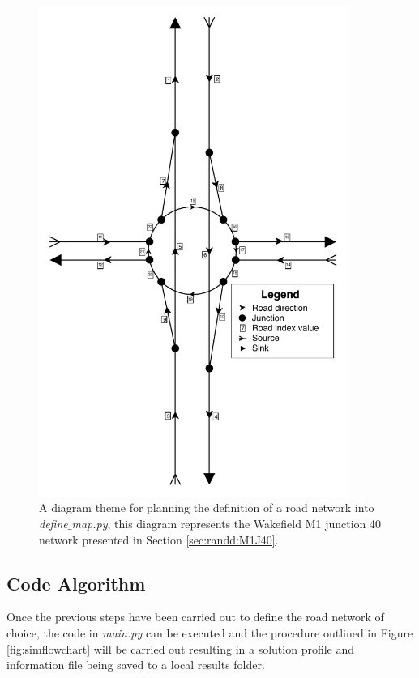 	\begin{figure}
    		\centering
        		\includegraphics[trim=0 0 0 0,clip,width=0.9\textwidth]{MapDiagram.pdf}
		\caption[Development : Network map diagram]{A diagram theme for planning the definition of a road network into \emph{define$\_$map.py}, this diagram represents the Wakefield M1 junction 40 network presented in Section \ref{sec:randd:M1J40}.}
		\label{fig:networkdiagram}
	\end{figure}

\subsection{Code Algorithm}

	Once the previous steps have been carried out to define the road network of choice, the code in \emph{main.py} can be executed and the procedure outlined in Figure \ref{fig:simflowchart} will be carried out resulting in a solution profile and information file being saved to a local results folder.

